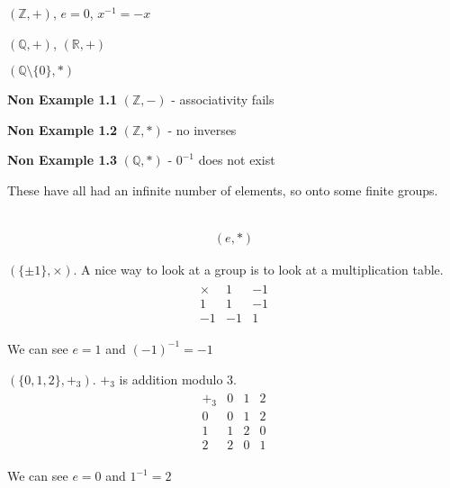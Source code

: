 \begin{example}
\((\mathbb{Z}, +)\), \(e = 0\), \(x^{-1} = -x\)
\end{example}

\begin{example}
\((\mathbb{Q}, +)\), \((\mathbb{R}, +)\)
\end{example}

\begin{example}
\((\mathbb{Q} \setminus \{ 0 \}, *)\)
\end{example}

\textbf{Non Example 1.1} \((\mathbb{Z}, -)\) - associativity fails

\textbf{Non Example 1.2} \((\mathbb{Z}, *)\) - no inverses

\textbf{Non Example 1.3} \((\mathbb{Q}, *)\) - \(0^{-1}\) does not exist

These have all had an infinite number of elements, so onto some finite groups.

\begin{example} ~\vspace*{-1.5\baselineskip}
  \begin{align*}
    (e, *)
  \end{align*} 
\end{example}

\begin{example}
\((\{\pm 1\}, \times)\). A nice way to look at a group is to look at a multiplication table.
\begin{align*}
    \begin{array}{c|cc}
        \times & 1 & -1 \\
        \hline
        1 & 1 & -1 \\
        -1 & -1 & 1 
    \end{array} 
\end{align*}

We can see \(e = 1\) and \((-1)^{-1} = -1\)
\end{example}

\begin{example}
\((\{0, 1, 2\}, +_3)\). \(+_3\) is addition modulo 3.
\begin{align*}
    \begin{array}{c|ccc}
        +_3 & 0 & 1 & 2 \\
        \hline
        0 & 0 & 1 & 2\\
        1 & 1 & 2 & 0 \\
        2 & 2 & 0 & 1
    \end{array} 
\end{align*}

We can see \(e = 0\) and \(1^{-1} = 2\)
\end{example}

